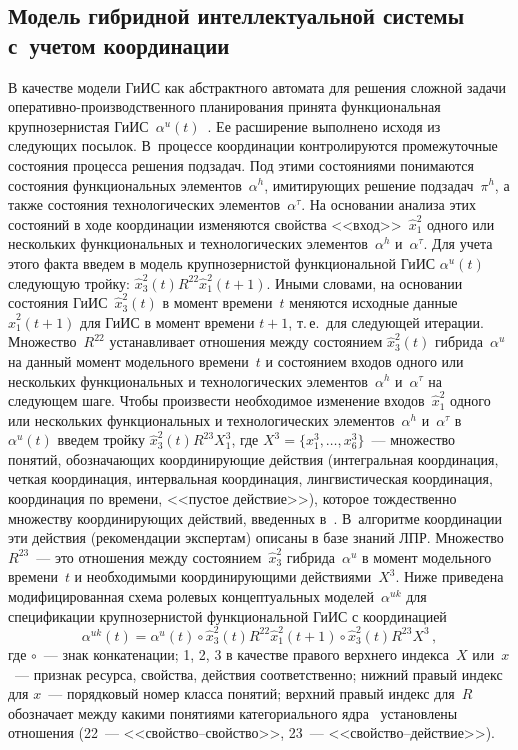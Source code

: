 \begin{multicols}{2}
\section{Модель гибридной интеллектуальной системы с~учетом 
координации}
  
  В качестве модели ГиИС как абстрактного автомата для решения сложной 
задачи опе\-ра\-тив\-но-про\-из\-вод\-ст\-вен\-но\-го планирования принята 
функциональная крупнозернистая ГиИС~$\alpha^{u}(t)$~\cite{8kol}. Ее  
расширение выполнено исходя из следующих посылок. В~процессе 
координации контролируются промежуточные состояния процесса решения 
подзадач. Под этими состояниями понимаются состояния функциональных 
элементов~$\alpha^h$, имитирующих решение подзадач~$\pi^h$, а также 
состояния технологических элементов~$\alpha^\tau$. На основании анализа 
этих состояний в ходе координации изменяются свойства 
<<вход>>~$\hat{x}_1^2$ одного или нескольких функциональных и 
технологических элементов~$\alpha^h$ и~$\alpha^\tau$. Для учета этого факта 
введем в модель крупнозернистой функциональной ГиИС $\alpha^{u}(t)$ 
следующую тройку: $\hat{x}_3^2(t) R^{22} \hat{x}_1^2(t+1)$. Иными словами, 
на основании состояния ГиИС~$\hat{x}_3^2(t)$ в момент времени~$t$ 
меняются исходные данные $\hat{x}_1^2(t+1)$ для ГиИС в момент времени 
$t+1$, т.\,е.\ для следующей итерации. Множество~$R^{22}$ устанавливает 
отношения между состоянием $\hat{x}_3^2(t)$ гибрида~$\alpha^u$ на данный 
момент модельного времени~$t$ и состоянием входов одного или нескольких 
функциональных и технологических элементов~$\alpha^h$ и~$\alpha^\tau$ на 
следующем шаге. Чтобы произвести необходимое изменение 
входов~$\hat{x}_1^2$ одного или нескольких функциональных и 
технологических элементов~$\alpha^h$ и~$\alpha^\tau$ в~$\alpha^u(t)$ введем 
тройку $\hat{x}_3^2(t) R^{23} X_1^3$, где $X^3=\{x_1^3, \ldots , x_6^3\}$~---\linebreak 
множество понятий, обозначающих ко\-ор\-ди\-ни\-ру\-ющие действия (интегральная 
координация, четкая координация, интервальная координация, лингвистическая 
координация, координация по времени, <<пустое действие>>), которое 
тождественно множеству координирующих действий, введенных 
в~\cite{15kol}. В~алгоритме координации эти действия (рекомендации 
экспертам) описаны в базе знаний ЛПР. Множество~$R^{23}$~--- это 
отношения между состоянием~$\hat{x}_3^2$ гибрида~$\alpha^u$ в момент 
модельного времени~$t$ и необходимыми координирующими 
действиями~$X^3$. Ниже приведена модифицированная схема ролевых 
концептуальных моделей~$\alpha^{uk}$ для спецификации крупнозернистой 
функциональной ГиИС с координацией
\begin{equation}
\alpha^{uk}(t)= \alpha^u(t)\circ \hat{x}_3^2(t) R^{22} \hat{x}_1^2(t+1)\circ \hat{x}_3^2(t) R^{23} X^3\,,
\label{e3kol}
\end{equation}
где $\circ$~--- знак конкатенации; 1, 2, 3 в качестве правого верхнего 
индекса~$X$ или~$x$~--- признак ресурса, свойства, действия соответственно; 
нижний правый индекс для $x$~--- порядковый номер класса понятий; верхний 
правый индекс для~$R$ обозначает между какими понятиями категориального 
ядра~\cite{8kol} установлены отношения (22~--- <<свой\-ст\-во--свой\-ст\-во>>, 
23~--- <<свой\-ст\-во--дей\-ст\-вие>>).
  

\end{multicols}
